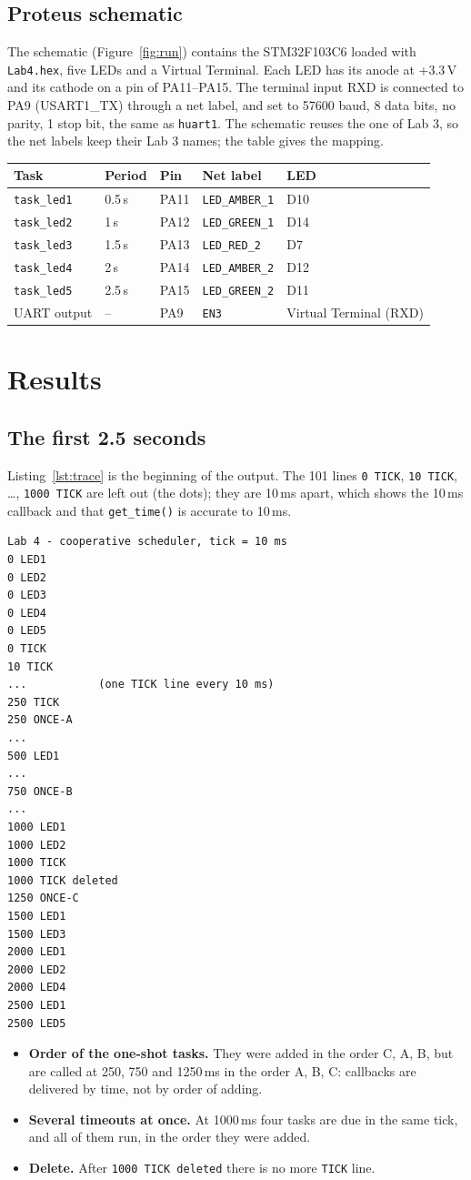 \documentclass[12pt,a4paper]{article}
\numberwithin{figure}{section}
\numberwithin{table}{section}
\newcommand{\code}[1]{\texttt{#1}}
\newcommand{\report}[1]{\subsection*{#1}}
\begin{document}
\report{Proteus schematic}
The schematic (Figure~\ref{fig:run}) contains the STM32F103C6 loaded with \code{Lab4.hex}, five LEDs and a Virtual Terminal. Each LED has its anode at +3.3\,V and its cathode on a pin of PA11--PA15. The terminal input RXD is connected to PA9 (USART1\_TX) through a net label, and set to 57600 baud, 8 data bits, no parity, 1 stop bit, the same as \code{huart1}. The schematic reuses the one of Lab 3, so the net labels keep their Lab 3 names; the table gives the mapping.
\begin{center}
\begin{tabular}{l l l l l}
\toprule
\textbf{Task} & \textbf{Period} & \textbf{Pin} & \textbf{Net label} & \textbf{LED}\\
\midrule
\code{task\_led1} & 0.5\,s & PA11 & \code{LED\_AMBER\_1} & D10\\
\code{task\_led2} & 1\,s   & PA12 & \code{LED\_GREEN\_1} & D14\\
\code{task\_led3} & 1.5\,s & PA13 & \code{LED\_RED\_2}   & D7\\
\code{task\_led4} & 2\,s   & PA14 & \code{LED\_AMBER\_2} & D12\\
\code{task\_led5} & 2.5\,s & PA15 & \code{LED\_GREEN\_2} & D11\\
\midrule
UART output & -- & PA9 & \code{EN3} & Virtual Terminal (RXD)\\
\bottomrule
\end{tabular}
\end{center}

\section{Results}
\report{The first 2.5 seconds}
Listing~\ref{lst:trace} is the beginning of the output. The 101 lines \code{0 TICK}, \code{10 TICK}, \ldots, \code{1000 TICK} are left out (the dots); they are 10\,ms apart, which shows the 10\,ms callback and that \code{get\_time()} is accurate to 10\,ms.

\begin{lstlisting}[style=term, caption={Output of the first 2.5\,s (TICK lines left out)}, label={lst:trace}]
Lab 4 - cooperative scheduler, tick = 10 ms
0 LED1
0 LED2
0 LED3
0 LED4
0 LED5
0 TICK
10 TICK
...           (one TICK line every 10 ms)
250 TICK
250 ONCE-A
...
500 LED1
...
750 ONCE-B
...
1000 LED1
1000 LED2
1000 TICK
1000 TICK deleted
1250 ONCE-C
1500 LED1
1500 LED3
2000 LED1
2000 LED2
2000 LED4
2500 LED1
2500 LED5
\end{lstlisting}
\begin{itemize}[leftmargin=1.4em,itemsep=1pt]
\item \textbf{Order of the one-shot tasks.} They were added in the order C, A, B, but are called at 250, 750 and 1250\,ms in the order A, B, C: callbacks are delivered by time, not by order of adding.
\item \textbf{Several timeouts at once.} At 1000\,ms four tasks are due in the same tick, and all of them run, in the order they were added.
\item \textbf{Delete.} After \code{1000 TICK deleted} there is no more \code{TICK} line.
\end{itemize}
\end{document}
